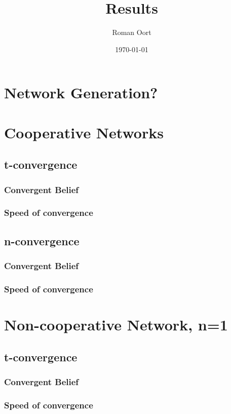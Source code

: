 \documentclass{article}
\title{Results}
\author{Roman Oort}
\date{\today}
\begin{document}
\maketitle

\tableofcontents
\newpage
\section{Network Generation?}

\section{Cooperative Networks}
\subsection{t-convergence}
\subsubsection{Convergent Belief}
\subsubsection{Speed of convergence}
\subsection{n-convergence}
\subsubsection{Convergent Belief}
\subsubsection{Speed of convergence}

\section{Non-cooperative Network, n=1}
\subsection{t-convergence}
\subsubsection{Convergent Belief}
\subsubsection{Speed of convergence}
\end{document}
